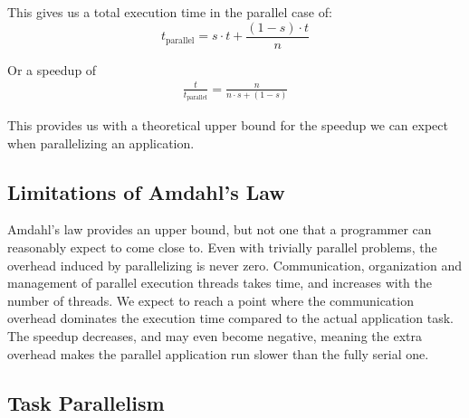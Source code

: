 \documentclass[BCOR20mm,DIV14,10pt,headinclude,footexclude,bibtotoc,liststotoc]{article}
\begin{document}
This gives us a total execution time in the parallel case of:
\begin{equation}
	t_\text{parallel} = s \cdot t + \frac{(1-s)\cdot t}{n}
\end{equation}

Or a speedup of
\begin{eqnarray}
	\frac{t}{t_\text{parallel}} = \frac{n}{n \cdot s + (1-s)}
\end{eqnarray}

\begin{figure}
	\centering
	\caption{}
	\label{fig:amdahl}
\end{figure}

This provides us with a theoretical upper bound for the speedup we can expect
when parallelizing an application.


\subsection{Limitations of Amdahl's Law}
Amdahl's law provides an upper bound, but not one that a programmer can
reasonably expect to come close to. Even with trivially parallel problems, the
overhead induced by parallelizing is never zero. Communication, organization and
management of parallel execution threads takes time, and increases with the
number of threads. We expect to reach a point where the communication overhead
dominates the execution time compared to the actual application task. The
speedup decreases, and may even become negative, meaning the extra overhead
makes the parallel application run slower than the fully serial one.


\subsection{Task Parallelism}
\end{document}
